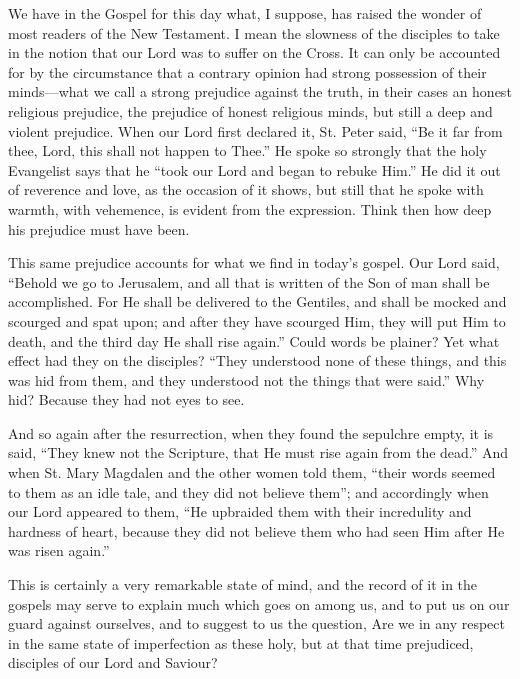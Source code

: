 We have in the Gospel for this day what, I
suppose, has raised the wonder of most readers of the New Testament. I
mean the slowness of the disciples to take in the notion that our Lord
was to suffer on the Cross. It can only be accounted for by the
circumstance that a contrary opinion had strong possession of their
minds—what we call a strong prejudice against the truth, in their
cases an honest religious prejudice, the prejudice of honest religious
minds, but still a deep and violent prejudice. When our Lord first
declared it, St. Peter said, ``Be it far from thee, Lord, this
shall not happen to Thee.'' He spoke so strongly that the holy
Evangelist says that he ``took our Lord and began to rebuke Him.''
He did it out of reverence and love, as the occasion of it shows, but
still that he spoke with warmth, with vehemence, is evident from the
expression. Think then how deep his prejudice must have been.

This same prejudice accounts for what we find in
today's gospel. Our Lord said, ``Behold we go to Jerusalem, and
all that is written of the Son of man shall be accomplished. For He
shall be delivered to the Gentiles, and shall be mocked and scourged
and spat upon; and after they have scourged Him, they will put Him to
death, and the third day He shall rise again.'' Could words be plainer?
Yet what effect had they on the disciples? ``They understood none of
these things, and this was hid from them, and they understood not the
things that were said.'' Why hid? Because they had not eyes to see.

And so again after the resurrection, when they
found the sepulchre empty, it is said, ``They knew not the Scripture,
that He must rise again from the dead.'' And when St. Mary Magdalen and
the other women told them, ``their words seemed to them as an idle
tale, and they did not believe them''; and accordingly when our Lord
appeared to them, ``He upbraided them with their incredulity and
hardness of heart, because they did not believe them who had seen Him
after He was risen again.''

This is certainly a very remarkable state of
mind, and the record of it in the gospels may serve to explain much
which goes on among us, and to put us on our guard against ourselves,
and to suggest to us the question, Are we in any respect in the same
state of imperfection as these holy, but at that time prejudiced,
disciples of our Lord and Saviour?

